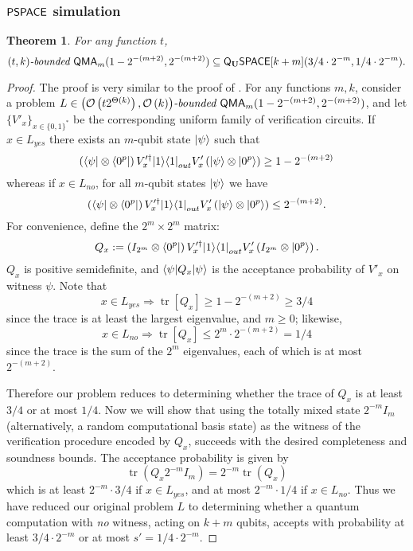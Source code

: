 \documentclass[11pt]{article}
\newtheorem{theorem}{Theorem}
\theoremstyle{definition}
\theoremstyle{remark}
\theoremstyle{definition}
\newcommand\QMA{{\sf{QMA}}}
\newcommand\PSPACE{{\sf{PSPACE}}}
\newcommand\bddQMA[5]{{\left(#1,#2\right)}\textit{-bounded }\QMA_{#3}(#4,#5)}
\newcommand{\classfont}{\sf}
\newcommand{\Unitary}{\mathbf{U}}
\newcommand{\unitaryQSPACE}[3]{{\classfont{Q}_\Unitary\classfont{SPACE}}[#1](#2,#3)}
\DeclareMathOperator{\tr}{tr}
\begin{document}
\subsubsection{$\PSPACE$ simulation}
\begin{theorem} \label{thm:pqpspace simulation} For any function $t$,
\[
\bddQMA{t}{k}{m}{1-2^{-(m+2)}}{2^{-(m+2)}}\subseteq
\unitaryQSPACE{k+m}{3/4\cdot 2^{-m}}{1/4 \cdot 2^{-m}}.
\]
\end{theorem}
\begin{proof}
The proof is very similar to the proof of \cite[Theorem 3.6]{mw05}. For any functions $m, k$, consider a problem $L\in\bddQMA{\mathcal{O}\left(t2^{\Theta(k)}\right)}{\mathcal{O}\left(k\right)}{m}{1-2^{-(m+2)}}{2^{-(m+2)}}$, and let $\{V'_x\}_{x\in\{0,1\}^*}$ be the corresponding uniform family of verification circuits.
If $x\in L_{yes}$ there exists an $m$-qubit state ${\left\vert{\psi}\right\rangle}$ such that
\begin{equation}
\left({\left\langle{\psi}\right\vert}\otimes {\left\langle{0^p}\right\vert}\right) V'^\dagger_x {\left\vert{1}\right\rangle}{\left\langle{1}\right\vert}_{out} V'_x \left({\left\vert{\psi}\right\rangle}\otimes {\left\vert{0^p}\right\rangle}\right) \ge 1-2^{-(m+2)}
\end{equation}
whereas if $x \in L_{no}$, for all $m$-qubit states ${\left\vert{\psi}\right\rangle}$ we have
\begin{equation}
\left({\left\langle{\psi}\right\vert}\otimes {\left\langle{0^p}\right\vert}\right) V'^\dagger_x {\left\vert{1}\right\rangle}{\left\langle{1}\right\vert}_{out} V'_x \left({\left\vert{\psi}\right\rangle}\otimes {\left\vert{0^p}\right\rangle}\right) \le 2^{-(m+2)}.
\end{equation}
For convenience, define the $2^m \times 2^m$ matrix:
\begin{equation}
Q_x := \left(I_{2^m}\otimes {\left\langle{0^p}\right\vert}\right) V'^\dagger_x {\left\vert{1}\right\rangle}{\left\langle{1}\right\vert}_{out} V'_x \left(I_{2^m}\otimes {\left\vert{0^p}\right\rangle}\right).
\end{equation}
$Q_x$ is positive semidefinite, and ${\left\langle{\psi}\right\vert}Q_x{\left\vert{\psi}\right\rangle}$ is the acceptance probability of $V'_x$ on witness $\psi$.
Note that
\begin{equation}
x\in L_{yes} \Rightarrow \tr[Q_x]\ge 1 - 2^{-(m+2)} \ge 3/4
\end{equation}
since the trace is at least the largest eigenvalue, and $m\geq 0$; likewise,
\begin{equation}
x\in L_{no} \Rightarrow \tr[Q_x]\le 2^m \cdot 2^{-(m+2)} = 1/4
\end{equation}
since the trace is the sum of the $2^m$ eigenvalues, each of which is at most $2^{-(m+2)}$. 

Therefore our problem reduces to determining whether the trace of $Q_x$ is at least $3/4$ or at most $1/4$.  Now we will show that using the totally mixed state $2^{-m}I_m$ (alternatively, a random computational basis state) as the witness of the verification procedure encoded by $Q_x$, succeeds with the desired completeness and soundness bounds.  The acceptance probability is given by
\begin{equation}
\tr(Q_x 2^{-m}I_m) = 2^{-m} \tr(Q_x)
\end{equation}
which is at least $2^{-m} \cdot 3/4$ if $x\in L_{yes}$, and at most $2^{-m} \cdot 1/4$ if $x\in L_{no}$. Thus we have reduced our original problem $L$ to determining whether a quantum computation with \emph{no} witness, acting on $k+m$ qubits, accepts with probability at least $3/4 \cdot 2^{-m}$ or at most $s'=1/4 \cdot 2^{-m}$.


\end{proof}
\end{document}
